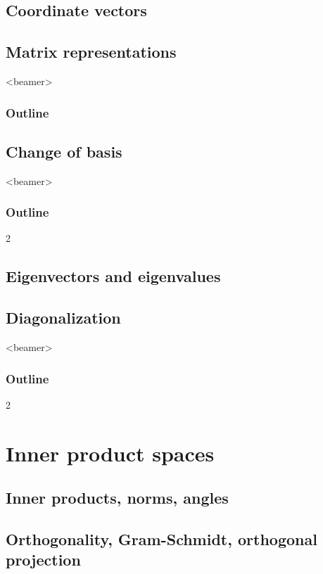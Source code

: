 \documentclass[handout,envcountsect,hyperref={colorlinks},notheorems]{beamer}
\theoremstyle{definition}
\theoremstyle{named}
\numberwithin{myalgctr}{section}
\begin{document}
\subsection{Coordinate vectors}\label{ss:coordinate}

\subsection{Matrix representations}\label{ss:matrixreps}
\begin{frame}<beamer>
             \frametitle{Outline}
\end{frame}

\subsection{Change of basis}
\begin{frame}<beamer>
             \frametitle{Outline}
             \begin{multicols}{2}
             \end{multicols}{2}
\end{frame}

\subsection{Eigenvectors and eigenvalues}
%
\subsection{Diagonalization}
\begin{frame}<beamer>
             \frametitle{Outline}
             \begin{multicols}{2}
             \end{multicols}{2}
\end{frame}


\section{Inner product spaces}
\subsection{Inner products, norms, angles}

\subsection{Orthogonality, Gram-Schmidt, orthogonal projection}

\end{document}
